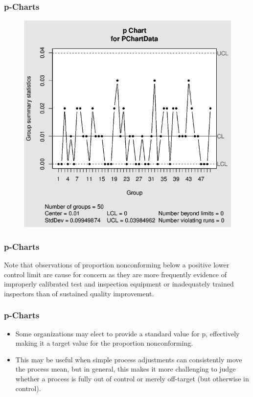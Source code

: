 \documentclass[Charts101.tex]{subfiles}
\begin{document}
\begin{frame}
	\frametitle{p-Charts}
	
\begin{figure}
\centering
\includegraphics[width=0.7\linewidth]{p-charts}
\caption{}
\label{fig:p-charts}
\end{figure}

\end{frame}
\begin{frame}
	\frametitle{p-Charts}
	\Large

Note that observations of proportion nonconforming below a positive lower control limit are cause for concern as they are more frequently evidence of improperly calibrated test and inspection equipment or inadequately trained inspectors than of sustained quality improvement.

\end{frame}
\begin{frame}
	\frametitle{p-Charts}
	\Large
\begin{itemize}
\item Some organizations may elect to provide a standard value for p, effectively making it a target value for the proportion nonconforming. \item This may be useful when simple process adjustments can consistently move the process mean, but in general, this makes it more challenging to judge whether a process is fully out of control or merely off-target (but otherwise in control).
\end{itemize}


\end{frame}
\end{document}
